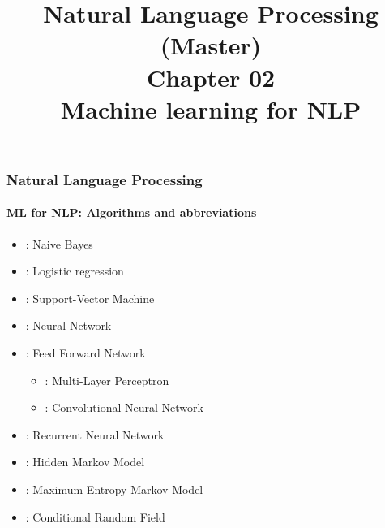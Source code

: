 \documentclass[xcolor=table]{beamer}
\title[ESI - NLP(master): 02- ML for NLP]%
{Natural Language Processing (Master)\\Chapter 02\\Machine learning for NLP}
\begin{document}
	
%		
%		
	
	\begin{frame}
		\frametitle{Natural Language Processing}
		\framesubtitle{ML for NLP: Algorithms and abbreviations}
		
		\begin{itemize}
			\item {}: Naive Bayes
			\item {}: Logistic regression
			\item {}: Support-Vector Machine
			\item {}: Neural Network
			\item {}: Feed Forward Network
			\begin{itemize}
				\item {}: Multi-Layer Perceptron
				\item {}: Convolutional Neural Network
			\end{itemize}
			\item {}: Recurrent Neural Network
			\item {}: Hidden Markov Model
			\item {}: Maximum-Entropy Markov Model
			\item {}: Conditional Random Field
		\end{itemize}
		
	\end{frame}
	
\end{document}
